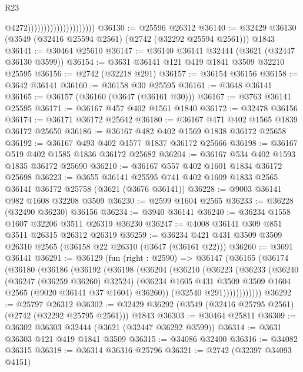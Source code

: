 \begin{lexlean}{R23}
\begin{coremodule}
                                              @4272)))))))))))))))))))))
@36130 := @25596 @26312
@36140 := @32429 @36130 (@3549 (@32416 @25594 @2561) (@2742 (@32292 @25594 @2561))) @1843
@36141 := @30464 @25610
@36147 := @36140 @36141 @32444 (@3621 (@32447 @36130 @3599))
@36154 := @3631 @36141 @121 @419 @1841 @3509 @32210 @25595
@36156 := @2742 (@32218 @291)
@36157 := @36154 @36156
@36158 := @3642 @36141
@36160 := @36158 @30 @25595
@36161 := @3648 @36141
@36165 := @36157 (@36160 (@3647 (@36161 @30)))
@36167 := @3763 @36141 @25595
@36171 := @36167 @457 @402 @1561 @1840
@36172 := @32478 @36156
@36174 := @36171 @36172 @25642
@36180 := @36167 @471 @402 @1565 @1839 @36172 @25650
@36186 := @36167 @482 @402 @1569 @1838 @36172 @25658
@36192 := @36167 @493 @402 @1577 @1837 @36172 @25666
@36198 := @36167 @519 @402 @1585 @1836 @36172 @25682
@36204 := @36167 @534 @402 @1593 @1835 @36172 @25690
@36210 := @36167 @557 @402 @1601 @1834 @36172 @25698
@36223 := @3655
    @36141
    @25595
    @741
    @402
    @1609
    @1833
    @2565
    @36141
    @36172
    @25758
    (@3621 (@3676 @36141))
@36228 := @9003 @36141 @982 @1608 @32208 @3509
@36230 := @2599 @1604 @2565
@36233 := @36228 (@32490 @36230) @36156
@36234 := @3940 @36141
@36240 := @36234 @1558 @1607 @32206 @3511 @26319 @36230
@36247 := @4008 @36141 @309 @851 @3511 @26315 @26312 @26319
@36259 := @36234 @421 @431 @3509 @3509 @26310 @2565 (@36158 @22 @26310 (@3647 (@36161 @22)))
@36260 := @3691 @36141
@36291 := @36129
    (fun (right : @2590) =>
    @36147
      (@36165
        (@36174
          (@36180
            (@36186
              (@36192
                (@36198
                  (@36204
                    (@36210
                      (@36223
                        (@36233
                          (@36240
                            (@36247 (@36259 @36260) @32524)
                            (@36234
                              @1605
                              @431
                              @3509
                              @3509
                              @1604
                              @2565
                              (@9020 @36141 @37 @1604)
                              @36260))
                          (@32540 @291))))))))))))
@36292 := @25797 @26312
@36302 := @32429 @36292 (@3549 (@32416 @25795 @2561) (@2742 (@32292 @25795 @2561))) @1843
@36303 := @30464 @25811
@36309 := @36302 @36303 @32444 (@3621 (@32447 @36292 @3599))
@36314 := @3631 @36303 @121 @419 @1841 @3509
@36315 := @34086 @32400
@36316 := @34082 @36315
@36318 := @36314 @36316 @25796
@36321 := @2742 (@32397 @34093 @4151)

\end{coremodule}
\end{lexlean}
